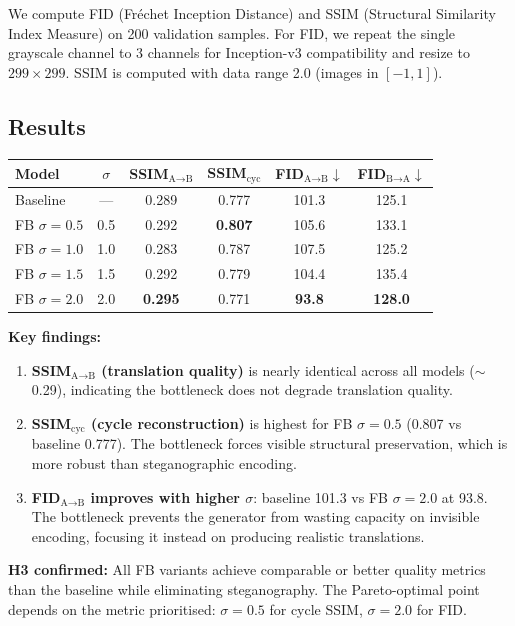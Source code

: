 \documentclass[11pt,a4paper]{article}
\theoremstyle{definition}
\begin{document}
We compute FID (Fr\'echet Inception Distance) and SSIM (Structural Similarity Index Measure) on 200 validation samples. For FID, we repeat the single grayscale channel to 3 channels for Inception-v3 compatibility and resize to $299 \times 299$. SSIM is computed with data range 2.0 (images in $[-1, 1]$).

\subsection{Results}

\begin{center}
\begin{tabular}{lccccc}
\toprule
Model & $\sigma$ & SSIM$_{\text{A}\to\text{B}}$ & SSIM$_{\text{cyc}}$ & FID$_{\text{A}\to\text{B}}$$\downarrow$ & FID$_{\text{B}\to\text{A}}$$\downarrow$ \\
\midrule
Baseline & --- & 0.289 & 0.777 & 101.3 & 125.1 \\
FB $\sigma=0.5$ & 0.5 & 0.292 & \textbf{0.807} & 105.6 & 133.1 \\
FB $\sigma=1.0$ & 1.0 & 0.283 & 0.787 & 107.5 & 125.2 \\
FB $\sigma=1.5$ & 1.5 & 0.292 & 0.779 & 104.4 & 135.4 \\
FB $\sigma=2.0$ & 2.0 & \textbf{0.295} & 0.771 & \textbf{93.8} & \textbf{128.0} \\
\bottomrule
\end{tabular}
\end{center}

\textbf{Key findings:}
\begin{enumerate}
    \item \textbf{SSIM$_{\text{A}\to\text{B}}$ (translation quality)} is nearly identical across all models ($\sim$0.29), indicating the bottleneck does not degrade translation quality.
    \item \textbf{SSIM$_{\text{cyc}}$ (cycle reconstruction)} is highest for FB $\sigma=0.5$ (0.807 vs baseline 0.777). The bottleneck forces visible structural preservation, which is more robust than steganographic encoding.
    \item \textbf{FID$_{\text{A}\to\text{B}}$ improves with higher $\sigma$}: baseline 101.3 vs FB $\sigma=2.0$ at 93.8. The bottleneck prevents the generator from wasting capacity on invisible encoding, focusing it instead on producing realistic translations.
\end{enumerate}

\textbf{H3 confirmed:} All FB variants achieve comparable or better quality metrics than the baseline while eliminating steganography. The Pareto-optimal point depends on the metric prioritised: $\sigma=0.5$ for cycle SSIM, $\sigma=2.0$ for FID.
\end{document}
